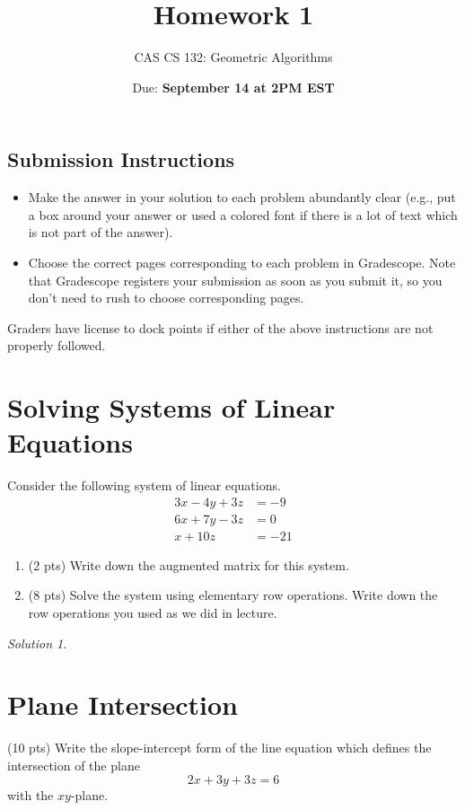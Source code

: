 \documentclass{article}
\title{Homework 1}
\author{CAS CS 132: Geometric Algorithms}
\date{Due: \textbf{September 14 at 2PM EST}}
\theoremstyle{remark}
\newtheorem*{solution}{Solution}
\begin{document}
\maketitle

\subsection*{Submission Instructions}
\begin{itemize}
\item Make the answer in your solution to each problem abundantly clear (e.g., put a box around your answer or used a colored font if there is a lot of text which is not part of the answer).
\item Choose the correct pages corresponding to each problem in Gradescope. Note that Gradescope registers your submission as soon as you submit it, so you don't need to rush to choose corresponding pages.
\end{itemize}
Graders have license to dock points if either of the above instructions are not properly followed.

\pagebreak
\section{Solving Systems of Linear Equations}

Consider the following system of linear equations.
\begin{align*}
  3x - 4y + 3z &= -9 \\
  6x + 7y - 3z &= 0 \\
  x + 10z &= -21
\end{align*}
\begin{enumerate}
\item (2 pts) Write down the augmented matrix for this system.
\item (8 pts)
  Solve the system using elementary row operations.
  Write down the row operations you used as we did in lecture.
\end{enumerate}

\begin{solution}
\end{solution}

\pagebreak
\section{Plane Intersection}

(10 pts) Write the slope-intercept form of the line equation which defines the intersection of the plane
\begin{displaymath}
  2x + 3y + 3z = 6
\end{displaymath}
with the $xy$-plane.
\end{document}

